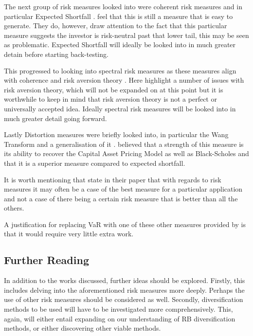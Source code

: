 \documentclass[12pt,a4paper]{article}
\begin{document}
The next group of risk measures looked into were coherent risk measures and in particular Expected Shortfall \citep{ACERBI20021505}. \cite{dowd2006after} feel that this is still a measure that is easy to generate. They do, however, draw attention to the fact that this particular measure suggests the investor is risk-neutral past that lower tail, this may be seen as problematic. Expected Shortfall will ideally be looked into in much greater detain before starting back-testing.

This progressed to looking into spectral risk measures as these measures align with coherence and risk aversion theory \citep{dowd2006after}. Here \cite{dowd2006after} highlight a number of issues with risk aversion theory, which will not be expanded on at this point but it is worthwhile to keep in mind that risk aversion theory is not a perfect or universally accepted idea. Ideally spectral risk measures will be looked into in much greater detail going forward.

Lastly Distortion measures were briefly looked into, in particular the Wang Transform and a generalisation of it  \citep{dowd2006after}. \cite{dowd2006after} believed that a strength of this measure is its ability to recover the Capital Asset Pricing Model as well as Black-Scholes and that it is a superior measure compared to expected shortfall.
 
It is worth mentioning that \cite{dowd2006after} state in their paper that with regards to risk measures it may often be a case of the best measure for a particular application and not a case of there being a certain risk measure that is better than all the others. 

A justification for replacing VaR with one of these other measures provided by \cite{dowd2006after} is that it would require very little extra work. 

\subsection{Further Reading}
\label{subsec:FurRead}

In addition to the works discussed, further ideas should be explored. Firstly, this includes delving into the aforementioned risk measures more deeply. Perhaps the use of other risk measures should be considered as well. Secondly, diversification methods to be used will have to be investigated more comprehensively. This, again, will either entail expanding on our understanding of RB diversification methods, or either discovering other viable methods. 
\end{document}
